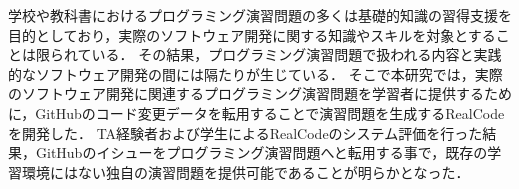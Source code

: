 \begin{abstractja}
学校や教科書におけるプログラミング演習問題の多くは基礎的知識の習得支援を目的としており，実際のソフトウェア開発に関する知識やスキルを対象とすることは限られている．
その結果，プログラミング演習問題で扱われる内容と実践的なソフトウェア開発の間には隔たりが生じている．
そこで本研究では，実際のソフトウェア開発に関連するプログラミング演習問題を学習者に提供するために，GitHubのコード変更データを転用することで演習問題を生成するRealCodeを開発した．
TA経験者および学生によるRealCodeのシステム評価を行った結果，GitHubのイシューをプログラミング演習問題へと転用する事で，既存の学習環境にはない独自の演習問題を提供可能であることが明らかとなった．
\end{abstractja}